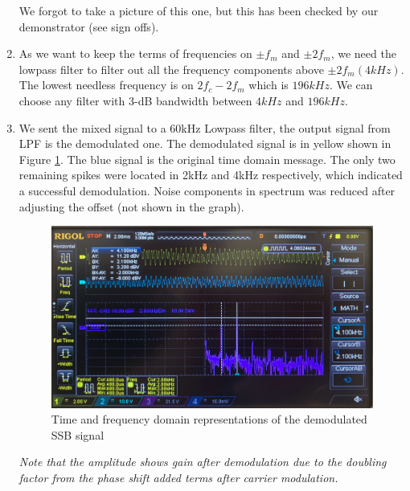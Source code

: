 \documentclass[11pt]{article}
\begin{document}
\begin{enumerate}[label=(\alph*)]
We forgot to take a picture of this one, but this has been checked by our demonstrator (see sign offs).

\item %
As we want to keep the terms of frequencies on $\pm f_m$ and $\pm 2f_m$, we need the lowpass filter to filter out all the frequency components above $\pm 2f_m (4kHz)$. The lowest needless frequency is on $2f_c - 2f_m$ which is $196kHz$. We can choose any filter with 3-dB bandwidth between $4k Hz$ and $196k Hz$. 
\item %
We sent the mixed signal to a 60kHz Lowpass filter, the output signal from LPF is the demodulated one. The demodulated signal is in yellow shown in Figure \ref{fig:W3Q2c}. The blue signal is the original time domain message. The only two remaining spikes were located in 2kHz and 4kHz respectively, which indicated a successful demodulation. Noise components in spectrum was reduced after adjusting the offset (not shown in the graph). 
\begin{figure}[H]
    \centering
    \includegraphics[width=15cm]{W3Q2c.jpg}
    \caption{Time and frequency domain representations of the demodulated SSB signal}
    \label{fig:W3Q2c}
\end{figure}
\textit{Note that the amplitude shows gain after demodulation due to the doubling factor from the phase shift added terms after carrier modulation.}
\end{enumerate}
\end{document}

